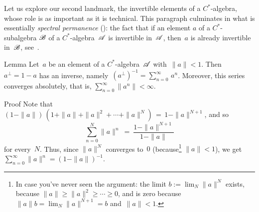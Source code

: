 \documentclass[a]{subfiles}
\begin{document}
%
%
\begin{parsec}%
\begin{point}%
Let us explore our second landmark,
the  invertible elements
of a $C^*$-algebra,
whose role 
is as important as it is technical.
This paragraph culminates in what is essentially
 \emph{spectral permanence} ():
the fact that if an element $a$ of a $C^*$-subalgebra $\mathscr{B}$
of a $C^*$-algebra~$\mathscr{A}$
is invertible in~$\mathscr{A}$,
then~$a$ is already invertible in~$\mathscr{B}$,
see~.
\end{point}
\begin{point}[geometric]{Lemma}%
Let~$a$ be an element of a $C^*$-algebra~$\mathscr{A}$ with~$\|a\|<1$.
Then~$a^\perp=1-a$ has an inverse,
namely~$(a^\perp)^{-1}= \sum_{n=0}^\infty\, a^n$.
Moreover, this series converges absolutely,
that is,
$\sum_{n=0}^\infty \|a^n\|<\infty$.
\begin{point}{Proof}%
Note that
$(1-\|a\|)\,(1+\|a\|+\|a\|^2+\dotsb+\|a\|^N) \,=\, 1-\|a\|^{N+1}$,
and so 
\begin{equation*}
\sum_{n=0}^N \|a\|^n \ =\  \frac{1-\|a\|^{N+1}}{1-\|a\|}
\end{equation*}
for every~$N$.
Thus,
since $\|a\|^N$ converges to~$0$
(because\footnote{
In case you've never seen the argument:
the limit $b:=\lim_N \|a\|^N$
exists, because $\|a\|\geq \|a\|^2\geq \dotsb\geq 0$,
and is zero
because $\|a\|b=\lim_N \|a\|^{N+1}=b$
and~$\|a\| < 1$.}
 $\|a\|<1$),
we  get $\sum_{n=0}^\infty \|a\|^n = (1-\|a\|)^{-1}$.


\end{point}
\end{point}
\end{parsec}
\end{document}
